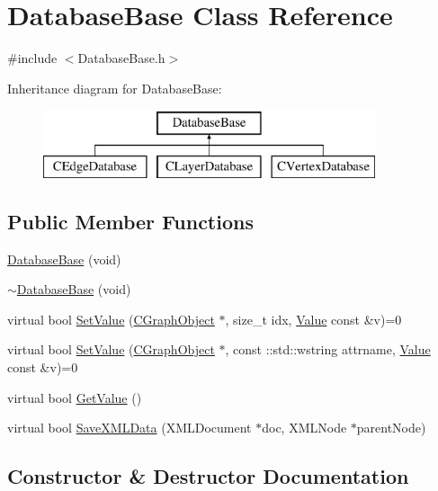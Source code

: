 \hypertarget{class_database_base}{}\section{Database\+Base Class Reference}
\label{class_database_base}


{\ttfamily \#include $<$Database\+Base.\+h$>$}

Inheritance diagram for Database\+Base\+:\begin{figure}[H]
\begin{center}
\leavevmode
\includegraphics[height=2.000000cm]{class_database_base}
\end{center}
\end{figure}
\subsection*{Public Member Functions}
\begin{DoxyCompactItemize}
\item 
\hyperlink{class_database_base_ad7da37dd4df3c3aaa5850a47d2698a58}{Database\+Base} (void)
\item 
\hyperlink{class_database_base_ad0e1b63d57220c5981935e54062c9bd4}{$\sim$\+Database\+Base} (void)
\item 
virtual bool \hyperlink{class_database_base_a2cc8b3df7c16b9ee45dd432dd5020057}{Set\+Value} (\hyperlink{class_c_graph_object}{C\+Graph\+Object} $\ast$, size\+\_\+t idx, \hyperlink{class_value}{Value} const \&v)=0
\item 
virtual bool \hyperlink{class_database_base_aa59101d74cd7d347a62d238495bc9b0c}{Set\+Value} (\hyperlink{class_c_graph_object}{C\+Graph\+Object} $\ast$, const \+::std\+::wstring attrname, \hyperlink{class_value}{Value} const \&v)=0
\item 
virtual bool \hyperlink{class_database_base_a584f16beb463603e255f236fc7e1fff6}{Get\+Value} ()
\item 
virtual bool \hyperlink{class_database_base_a15bc50a6cbc8fcdd023c6c865a999a3b}{Save\+X\+M\+L\+Data} (X\+M\+L\+Document $\ast$doc, X\+M\+L\+Node $\ast$parent\+Node)
\end{DoxyCompactItemize}


\subsection{Constructor \& Destructor Documentation}
\hypertarget{class_database_base_ad7da37dd4df3c3aaa5850a47d2698a58}{}
